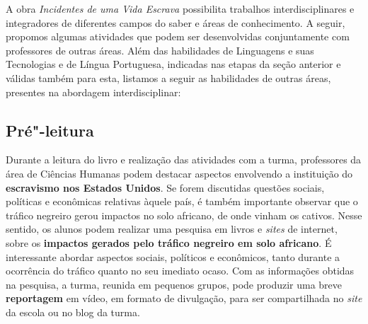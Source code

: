 \documentclass[12pt]{extarticle}
\begin{document}



A obra \emph{Incidentes de uma Vida Escrava} possibilita trabalhos
interdisciplinares e integradores de diferentes campos do saber e áreas
de conhecimento. A seguir, propomos algumas atividades que podem ser
desenvolvidas conjuntamente com professores de outras áreas. Além das
habilidades de Linguagens e suas Tecnologias e de Língua Portuguesa,
indicadas nas etapas da seção anterior e válidas também para esta,
listamos a seguir as habilidades de outras áreas, presentes na abordagem
interdisciplinar:

\subsection{Pré"-leitura}


Durante a leitura do livro e realização das atividades com a
turma, professores da área de Ciências Humanas podem destacar aspectos
envolvendo a instituição do \textbf{escravismo nos Estados Unidos}. Se
forem discutidas questões sociais, políticas e econômicas relativas
àquele país, é também importante observar que o tráfico negreiro gerou
impactos no solo africano, de onde vinham os cativos. Nesse sentido, os
alunos podem realizar uma pesquisa em livros e \emph{sites} de internet,
sobre os \textbf{impactos gerados pelo tráfico negreiro em solo
africano}. É interessante abordar aspectos sociais, políticos e
econômicos, tanto durante a ocorrência do tráfico quanto no seu imediato
ocaso. Com as informações obtidas na pesquisa, a turma, reunida em
pequenos grupos, pode produzir uma breve \textbf{reportagem} em vídeo,
em formato de divulgação, para ser compartilhada no \emph{site} da
escola ou no blog da turma.
\end{document}
